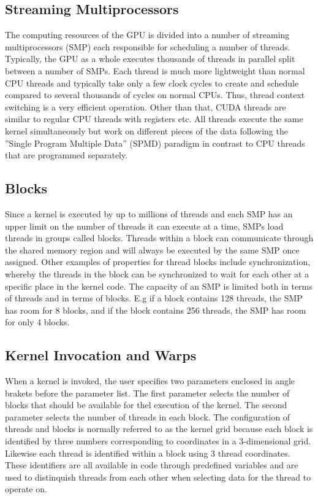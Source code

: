 \subsection{Streaming Multiprocessors}
The computing resources of the GPU is divided into a number of streaming multiprocessors (SMP) each responsible for scheduling a number of threads. Typically, the GPU as a whole executes thousands of threads in parallel split between a number of SMPs. Each thread is much more lightweight than normal CPU threads and typically take only a few clock cycles to create and schedule compared to several thousands of cycles on normal CPUs. Thus, thread context switching is a very efficient operation. Other than that, CUDA threads are similar to regular CPU threads with registers etc. All threads execute the same kernel simultaneously but work on different pieces of the data following the ''Single Program Multiple Data'' (SPMD) paradigm in contrast to CPU threads that are programmed separately. \\

\subsection{Blocks}
Since a kernel is executed by up to millions of threads and each SMP has an upper limit on the number of threads it can execute at a time, SMPs load threads in groups called blocks. Threads within a block can communicate through the shared memory region and will always be executed by the same SMP once assigned. Other examples of properties for thread blocks include synchronization, whereby the threads in the block can be synchronized to wait for each other at a specific place in the kernel code. The capacity of an SMP is limited both in terms of threads and in terms of blocks. E.g if a block contains 128 threads, the SMP has room for 8 blocks, and if the block contains 256 threads, the SMP has room for only 4 blocks.

\subsection{Kernel Invocation and Warps}
\label{sec:kernelandwarps}
When a kernel is invoked, the user specifies two parameters enclosed in angle brakets before the parameter list. The first parameter selects the number of blocks that should be available for thel execution of the kernel. The second parameter selects the number of threads in each block. The configuration of threads and blocks is normally referred to as the kernel grid because each block is identified by three numbers corresponding to coordinates in a 3-dimensional grid. Likewise each thread is identified within a block using 3 thread coordinates. These identifiers are all available in code through predefined variables and are used to distinquish threads from each other when selecting data for the thread to operate on.

